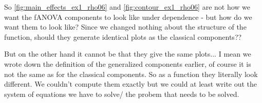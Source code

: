 So \autoref{fig:main_effects_ex1_rho06} and \autoref{fig:contour_ex1_rho06} are not how we want the fANOVA components to look like under dependence - but how do we want them to look like?
Since we changed nothing about the structure of the function, should they generate identical plots as the classical components??

But on the other hand it cannot be that they give the same plots... I mean we wrote down the definition of the generalized components earlier, of course it is not the same as for the classical components. So as a function they literally look different. We couldn't compute them exactly but we could at least write out the system of equations we have to solve/ the probem that needs to be solved.